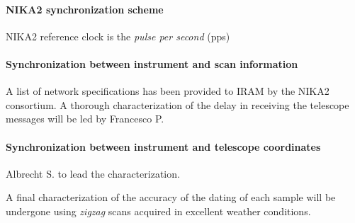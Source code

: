 \paragraph{NIKA2 synchronization scheme}
NIKA2 reference clock is the \emph{pulse per second} (pps) 

\paragraph{Synchronization between instrument and scan information}
A list of network specifications has been provided to IRAM by the NIKA2 consortium. A thorough characterization of the delay in receiving the telescope messages will be led by Francesco P.

\paragraph{Synchronization between instrument and telescope coordinates}
Albrecht S. to lead the characterization.

A final characterization of the accuracy of the dating of each sample will be undergone using \emph{zigzag} scans acquired in excellent weather conditions. 


